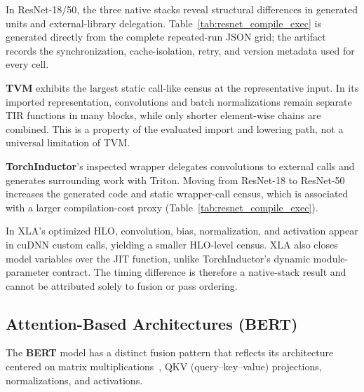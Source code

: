 \documentclass[sigconf]{acmart}
\renewcommand{\arraystretch}{1.1}
\DeclareRobustCommand{\tcode}[1]{\texttt{\seqsplit{#1}}}
\begin{document}
In ResNet-18/50, the three native stacks reveal structural differences in generated units and external-library delegation. Table~\ref{tab:resnet_compile_exec} is generated directly from the complete repeated-run JSON grid; the artifact records the synchronization, cache-isolation, retry, and version metadata used for every cell.

\textbf{TVM} exhibits the largest static call-like census at the representative input. In its imported representation, convolutions and batch normalizations remain separate TIR functions in many blocks, while only shorter element-wise chains are combined. This is a property of the evaluated import and lowering path, not a universal limitation of TVM.

\textbf{TorchInductor}'s inspected wrapper delegates convolutions to external calls and generates surrounding \tcode{BatchNorm+ReLU} work with Triton. Moving from ResNet-18 to ResNet-50 increases the generated code and static wrapper-call census, which is associated with a larger compilation-cost proxy (Table~\ref{tab:resnet_compile_exec}).

In XLA's optimized HLO, convolution, bias, normalization, and activation appear in cuDNN custom calls, yielding a smaller HLO-level census. XLA also closes model variables over the JIT function, unlike TorchInductor's dynamic module-parameter contract. The timing difference is therefore a native-stack result and cannot be attributed solely to fusion or pass ordering.

\subsection{Attention-Based Architectures (BERT)}

\begin{table}[t]
\centering
\caption{BERT --- \textbf{compilation-cost proxy} and \textbf{execution} time (mean $\pm$ sample sd over \(K=5\) independent process means, ms); each process uses 10 warmups and 50 synchronized executions.}
\label{tab:bert_compile_exec}
\footnotesize
\renewcommand{\arraystretch}{1.0}
\end{table}

The \textbf{BERT} model has a distinct fusion pattern that reflects its architecture centered on matrix multiplications~\cite{pati2021demystifying}, QKV (query--key--value) projections, normalizations, and activations.
\end{document}
